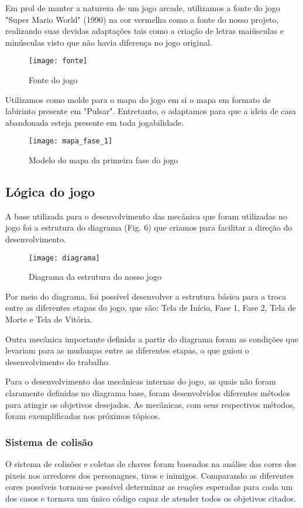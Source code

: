 \documentclass[conference]{IEEEtran}
\begin{document}
Em prol de manter a natureza de um jogo arcade, utilizamos a fonte do jogo "Super Mario World" (1990) na cor vermelha como a fonte do nosso projeto, realizando suas devidas adaptações tais como a criação de letras maiúsculas e minúsculas visto que não havia diferença no jogo original. 

\begin{figure}[H]
\centering
\texttt{[image: fonte]}
\caption{Fonte do jogo}
\end{figure} 

Utilizamos como molde para o mapa do jogo em si o mapa em formato de labirinto presente em "Pulsar". Entretanto, o adaptamos para que a ideia de casa abandonada esteja presente em toda jogabilidade.

\begin{figure}[H]
\centering
\texttt{[image: mapa\_fase\_1]}
\caption{Modelo do mapa da primeira fase do jogo}
\end{figure}  

\subsection{Lógica do jogo}

A base utilizada para o desenvolvimento das mecânica que foram utilizadas no jogo foi a estrutura do diagrama (Fig. 6) que criamos para facilitar a direção do desenvolvimento.

\begin{figure}[h]
\centering
\texttt{[image: diagrama]}
\caption{Diagrama da estrutura do nosso jogo}
\end{figure}

Por meio do diagrama, foi possível desenvolver a estrutura básica para a troca entre as diferentes etapas do jogo, que são: Tela de Início, Fase 1, Fase 2, Tela de Morte e Tela de Vitória.

Outra mecânica importante definida a partir do diagrama foram as condições que levariam para as mudanças entre as diferentes etapas, o que guiou o desenvolvimento do trabalho.

Para o desenvolvimento das mecânicas internas do jogo, as quais não foram claramente definidas no diagrama base, foram desenvolvidos diferentes métodos para atingir os objetivos desejados. As mecânicas, com seus respectivos métodos, foram exemplificadas nos próximos tópicos.

\subsubsection{Sistema de colisão}
 O sistema de colisões e coletas de chaves foram baseados na análise das cores dos pixeis nos arredores dos personagnes, tiros e inimigos. Comparando as diferentes cores possíveis tornou-se possível determinar as reações esperadas para cada um dos casos e tornava um único código capaz de atender todos os objetivos citados.
\end{document}
